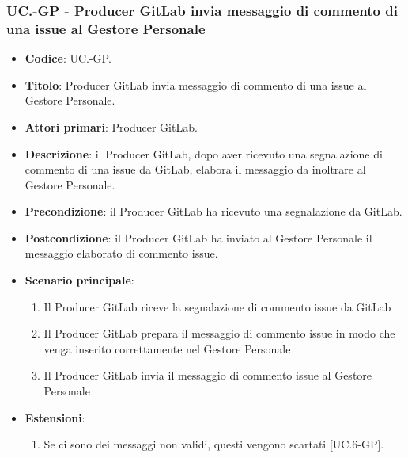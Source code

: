 
		\subsubsection{UC\theuccount.\thesubuccount-GP - Producer GitLab invia messaggio di commento di una issue al Gestore Personale}
		\begin{itemize}
			\item \textbf{Codice}: UC\theuccount.\thesubuccount-GP.
			\item \textbf{Titolo}: Producer GitLab invia messaggio di commento di una issue al Gestore Personale.
			\item \textbf{Attori primari}: Producer GitLab.
			\item \textbf{Descrizione}: il Producer GitLab, dopo aver ricevuto una segnalazione di commento di una issue da GitLab, elabora il messaggio da inoltrare al Gestore Personale.
			\item \textbf{Precondizione}: il Producer GitLab ha ricevuto una segnalazione da GitLab.
			\item \textbf{Postcondizione}: il Producer GitLab ha inviato al Gestore Personale il messaggio
			elaborato di commento issue.
			\item \textbf{Scenario principale}:
			\begin{enumerate}
				\item Il Producer GitLab riceve la segnalazione di commento issue da GitLab
				\item Il Producer GitLab prepara il messaggio di commento issue in modo che venga inserito correttamente nel Gestore Personale
				\item Il Producer GitLab invia il messaggio di commento issue al Gestore Personale
			\end{enumerate}
			\item \textbf{Estensioni}:
			\begin{enumerate}
				\item Se ci sono dei messaggi non validi, questi vengono scartati [UC\theuccount.6-GP].
			\end{enumerate}
		\end{itemize}


